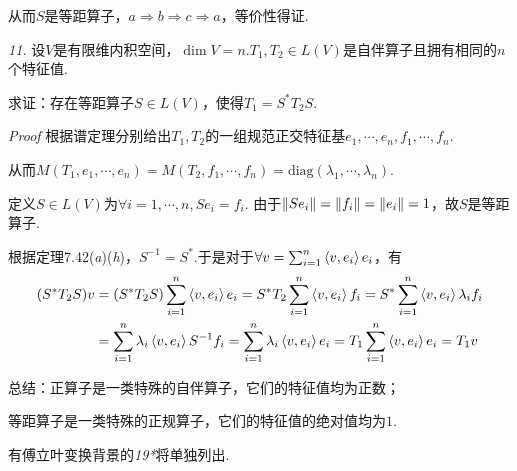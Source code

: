 从而\(S\)是等距算子，\(a \Rightarrow b \Rightarrow c \Rightarrow a\)，等价性得证.

\hspace*{\fill}

\textit{11.}
设\(V\)是有限维内积空间，\(\dim V=n\).\(T_1,T_2 \in L(V)\)是自伴算子且拥有相同的\(n\)个特征值.

求证：存在等距算子\(S \in L(V)\)，使得\(T_1=S^*T_2S\).

\textit{Proof}
根据谱定理分别给出\(T_1,T_2\)的一组规范正交特征基\(e_1,\cdots,e_n,f_1,\cdots,f_n\).

从而\(M(T_1,e_1,\cdots,e_n)=M(T_2,f_1,\cdots,f_n)=\mathrm{diag}(\lambda_1,\cdots,\lambda_n)\).

定义\(S \in L(V)\)为\(\forall i=1,\cdots,n,Se_i=f_i\).
由于\(\left\lVert Se_i \right\rVert=\left\lVert f_i \right\rVert=\left\lVert e_i \right\rVert=1\)，故\(S\)是等距算子.

根据定理7.42(\textit{a})(\textit{h})，\(S^{-1}=S^*\).于是对于\(\forall v=\sum_{i=1}^n \left\langle v,e_i \right\rangle e_i\)，有
    \begin{align*}
        (S^*T_2S)v&=(S^*T_2S)\sum_{i=1}^n \left\langle v,e_i \right\rangle e_i=S^*T_2\sum_{i=1}^n \left\langle v,e_i \right\rangle f_i
        =S^*\sum_{i=1}^n \left\langle v,e_i \right\rangle\lambda_if_i \\
        &=\sum_{i=1}^n \lambda_i\left\langle v,e_i \right\rangle S^{-1}f_i
        =\sum_{i=1}^n \lambda_i\left\langle v,e_i \right\rangle e_i=T_1\sum_{i=1}^n \left\langle v,e_i \right\rangle e_i=T_1v
    \end{align*}

\hspace*{\fill}

总结：正算子是一类特殊的自伴算子，它们的特征值均为正数；

等距算子是一类特殊的正规算子，它们的特征值的绝对值均为\(1\).

\hspace*{\fill}

有傅立叶变换背景的\textit{19*}将单独列出.

